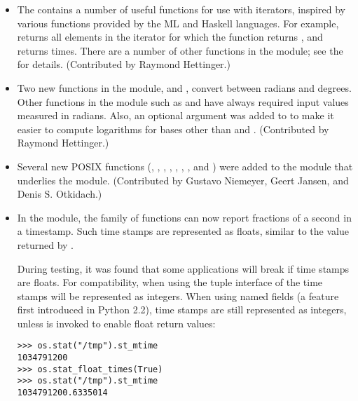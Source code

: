 \documentclass{howto}
\begin{document}
\begin{itemize}
\item The  contains a number of useful functions for
use with iterators, inspired by various functions provided by the ML
and Haskell languages.  For example,
 returns all elements in
the iterator for which the function  returns
, and  returns
  times.  There are a number of other functions in
the module; see the  for details.
(Contributed by Raymond Hettinger.)

\item Two new functions in the  module,
 and ,
convert between radians and degrees.  Other functions in the
 module such as  and
 have always required input values measured in
radians.  Also, an optional  argument was added to
 to make it easier to compute logarithms for
bases other than  and .  (Contributed by Raymond
Hettinger.)

\item Several new POSIX functions (, ,
, , , ,
, and ) were added to the
 module that underlies the  module.
(Contributed by Gustavo Niemeyer, Geert Jansen, and Denis S. Otkidach.)

\item In the  module, the  family of
functions can now report fractions of a second in a timestamp.  Such
time stamps are represented as floats, similar to
the value returned by .

During testing, it was found that some applications will break if time
stamps are floats.  For compatibility, when using the tuple interface
of the  time stamps will be represented as integers.
When using named fields (a feature first introduced in Python 2.2),
time stamps are still represented as integers, unless
 is invoked to enable float return
values:

\begin{verbatim}
>>> os.stat("/tmp").st_mtime
1034791200
>>> os.stat_float_times(True)
>>> os.stat("/tmp").st_mtime
1034791200.6335014
\end{verbatim}


\end{itemize}
\end{document}
